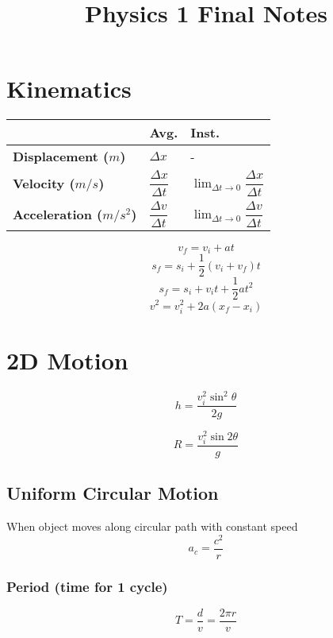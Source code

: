 \documentclass[12pt, twocolumn]{article}
\title{\textbf{Physics 1 Final Notes}}
\date{}
\begin{document}
\maketitle

\begin{spacing}{1.5}

\section{Kinematics}

\begin{tabular}{p{4cm}|p{1.3cm}|p{2cm}}

& \textbf{Avg.} & \textbf{Inst.} \\
\hline
\textbf{Displacement ($m$)} & $\Delta x$ & - \\

\textbf{Velocity ($m/s$)} & $\dfrac{\Delta x}{\Delta t}$ & $\lim_{\Delta t \to 0} \dfrac{\Delta x}{\Delta t}$ \\[0.3cm]

\textbf{Acceleration ($m/s^2$)} & $\dfrac{\Delta v}{\Delta t}$ & $\lim_{\Delta t \to 0} \dfrac{\Delta v}{\Delta t}$ \\[0.3cm]

\end{tabular}

$$v_f = v_i + at$$
$$s_f = s_i + \frac{1}{2} (v_i + v_f) t$$
$$s_f = s_i + v_i t + \frac{1}{2} at^2$$
$$v^2 = v_i^2 + 2a(x_f - x_i)$$

\section{2D Motion}

$$h = \frac{v_i^2 \sin^2{\theta}}{2g}$$

$$R = \frac{v_i^2 \sin{2\theta}}{g}$$

\subsection{Uniform Circular Motion}

When object moves along circular path with constant speed
$$a_c = \frac{c^2}{r}$$

\subsubsection{Period (time for 1 cycle)}

$$T = \frac{d}{v} = \frac{2 \pi r}{v}$$


\end{spacing}
\end{document}
